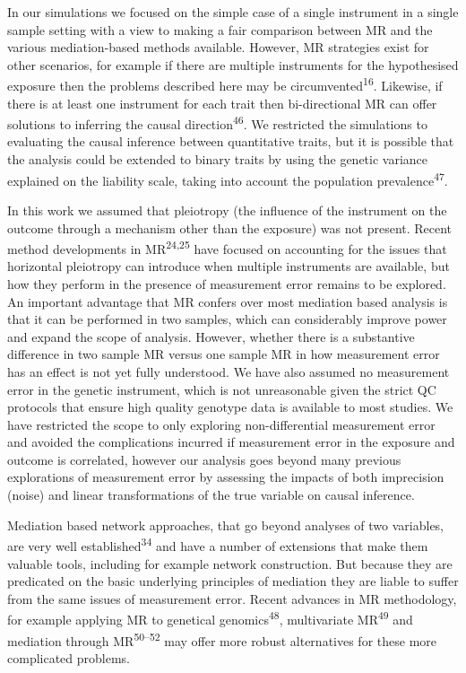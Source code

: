 \documentclass[]{article}
\begin{document}
In our simulations we focused on the simple case of a single instrument
in a single sample setting with a view to making a fair comparison
between MR and the various mediation-based methods available. However,
MR strategies exist for other scenarios, for example if there are
multiple instruments for the hypothesised exposure then the problems
described here may be circumvented\textsuperscript{16}. Likewise, if
there is at least one instrument for each trait then bi-directional MR
can offer solutions to inferring the causal
direction\textsuperscript{46}. We restricted the simulations to
evaluating the causal inference between quantitative traits, but it is
possible that the analysis could be extended to binary traits by using
the genetic variance explained on the liability scale, taking into
account the population prevalence\textsuperscript{47}.

In this work we assumed that pleiotropy (the influence of the instrument
on the outcome through a mechanism other than the exposure) was not
present. Recent method developments in MR\textsuperscript{24,25} have
focused on accounting for the issues that horizontal pleiotropy can
introduce when multiple instruments are available, but how they perform
in the presence of measurement error remains to be explored. An
important advantage that MR confers over most mediation based analysis
is that it can be performed in two samples, which can considerably
improve power and expand the scope of analysis. However, whether there
is a substantive difference in two sample MR versus one sample MR in how
measurement error has an effect is not yet fully understood. We have
also assumed no measurement error in the genetic instrument, which is
not unreasonable given the strict QC protocols that ensure high quality
genotype data is available to most studies. We have restricted the scope
to only exploring non-differential measurement error and avoided the
complications incurred if measurement error in the exposure and outcome
is correlated, however our analysis goes beyond many previous
explorations of measurement error by assessing the impacts of both
imprecision (noise) and linear transformations of the true variable on
causal inference.

Mediation based network approaches, that go beyond analyses of two
variables, are very well established\textsuperscript{34} and have a
number of extensions that make them valuable tools, including for
example network construction. But because they are predicated on the
basic underlying principles of mediation they are liable to suffer from
the same issues of measurement error. Recent advances in MR methodology,
for example applying MR to genetical genomics\textsuperscript{48},
multivariate MR\textsuperscript{49} and mediation through
MR\textsuperscript{50--52} may offer more robust alternatives for these
more complicated problems.
\end{document}
